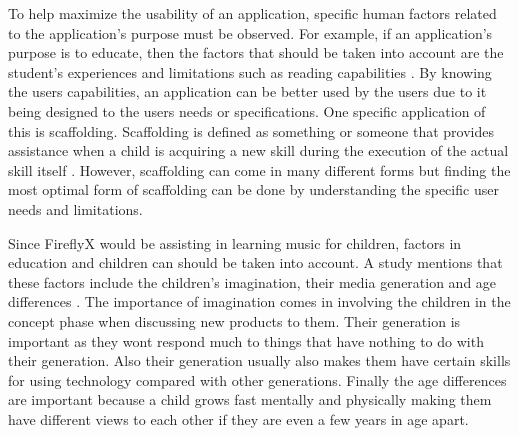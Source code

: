 To help maximize the usability of an application, specific human factors related to the application's purpose must be observed. For example, if an application's purpose is to educate, then the factors that should be taken into account are the student's experiences and limitations such as reading capabilities \cite{radu2014augmented}. By knowing the users capabilities, an application can be better used by the users due to it being designed to the users needs or specifications. One specific application of this is scaffolding. Scaffolding is defined as something or someone that provides assistance when a child is acquiring a new skill during the execution of the actual skill itself \cite{strommen1998interface}. However, scaffolding can come in many different forms but finding the most optimal form of scaffolding can be done by understanding the specific user needs and limitations.

Since FireflyX would be assisting in learning music for children, factors in education and children can should be taken into account. A study mentions that these factors include the children's imagination, their media generation and age differences \cite{oosterholt1996interaction}. The importance of imagination comes in involving the children in the concept phase when discussing new products to them. Their generation is important as they wont respond much to things that have nothing to do with their generation. Also their generation usually also makes them have certain skills for using technology compared with other generations. Finally the age differences are important because a child grows fast mentally and physically making them have different views to each other if they are even a few years in age apart.



